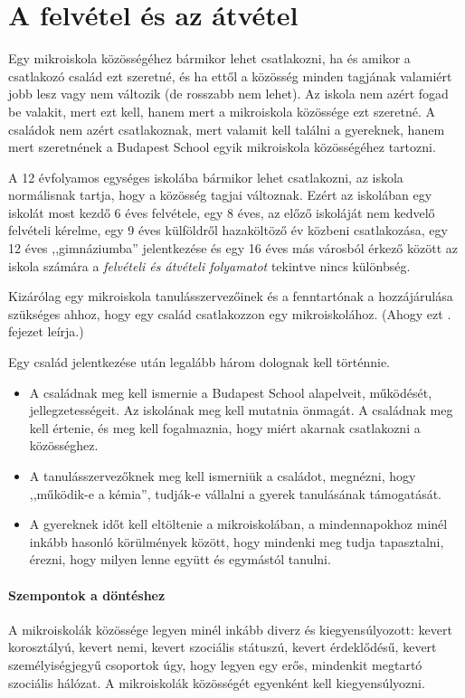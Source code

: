 \section{A felvétel és az átvétel}
\label{sec:felvetel-atvetel}
Egy mikroiskola közösségéhez bármikor lehet csatlakozni, ha és amikor a
csatlakozó
család ezt szeretné, és ha ettől a közösség minden tagjának valamiért  jobb
lesz vagy nem változik (de rosszabb nem lehet).
Az iskola nem azért fogad be valakit, mert
ezt kell, hanem mert a mikroiskola közössége ezt szeretné.
A családok nem azért csatlakoznak, mert valamit kell találni a gyereknek, hanem
mert
szeretnének a Budapest School egyik mikroiskola közösségéhez tartozni.

A 12 évfolyamos egységes iskolába bármikor lehet csatlakozni, az iskola
normálisnak tartja, hogy a közösség tagjai változnak.
Ezért az iskolában egy iskolát most kezdő 6 éves felvétele, egy 8 éves, az előző
iskoláját nem kedvelő felvételi kérelme, egy 9 éves
külföldről hazaköltöző év közbeni csatlakozása, egy 12 éves ,,gimnáziumba''
jelentkezése és egy 16 éves más városból érkező  között az iskola
számára
a \emph{felvételi és átvételi folyamatot} tekintve nincs különbség.

Kizárólag egy mikroiskola tanulásszervezőinek és a fenntartónak a hozzájárulása
szükséges ahhoz, hogy
egy család csatlakozzon egy mikroiskolához. (Ahogy ezt
. fejezet leírja.)

Egy család jelentkezése után legalább három dolognak kell történnie.
\begin{itemize}
      \item A családnak meg kell ismernie a Budapest School alapelveit,
            működését, jellegzetességeit. Az iskolának meg kell mutatnia
            önmagát. A
            családnak meg kell értenie,  és meg kell fogalmaznia, hogy miért
            akarnak
            csatlakozni a közösséghez.
      \item A tanulásszervezőknek meg kell ismerniük a családot, megnézni, hogy
            ,,működik-e a kémia'', tudják-e vállalni a gyerek tanulásának
            támogatását.
      \item A gyereknek időt kell eltöltenie a mikroiskolában, a mindennapokhoz
            minél inkább hasonló körülmények között, hogy mindenki meg tudja
            tapasztalni,
            érezni, hogy milyen lenne együtt és egymástól tanulni.
\end{itemize}

\paragraph{Szempontok a döntéshez}
A mikroiskolák közössége legyen minél inkább diverz és kiegyensúlyozott: kevert
korosztályú, kevert nemi, kevert szociális státuszú, kevert
érdeklődésű, kevert személyiségjegyű csoportok úgy, hogy legyen egy erős,
mindenkit megtartó szociális
hálózat. A mikroiskolák közösségét egyenként kell kiegyensúlyozni.%

